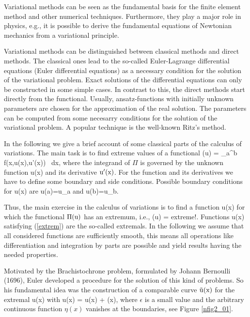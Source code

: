 \label{Foundations of the Calculus of Variations}

Variational methods can be seen as the fundamental basis for the finite
element method and other numerical techniques. Furthermore, they play
a major role in physics, e.g., it is possible to derive the fundamental 
equations of Newtonian mechanics from a variational principle.

Variational methods can be distinguished between classical methods and
direct methods. 
The classical ones lead to the so-called Euler-Lagrange 
differential equations (Euler differential equations) 
as a necessary condition for the solution of the variational problem. 
Exact solutions
of the differential equations can only be constructed in some simple 
cases. In contrast to this, the direct methods start directly from
the functional. Usually, ansatz-functions with initially unknown
parameters are chosen for the approximation of the real solution.
The parameters can be computed from some necesarry conditions for the 
solution of the variational problem. A popular technique is the
well-known Ritz's method.

In the following we give a brief account of some classical parts
of the calculus of variations. The main task is to find extreme 
values of a functional
\eb
\rm
\Pi(u) = \int_a^b f(x,u(x),u'(x)) \, dx,
\label{functionalpicalcvar}
\ee
where the integrand of $\Pi$ is governed by the unknown function
u(x) and its derivative $\rm u'(x)$. For the function and its derivatives
we have to define some boundary and side conditions. Possible boundary
conditions for u(x) are
\eb
\rm
u(a)=u_a \quad and \quad u(b)=u_b.
\ee

Thus, the main exercise in the calculus of variations is to find a function
u(x) for which the functional $\rm \Pi(u)$ has an extremum, i.e.,
\eb
\rm
\Pi(u) = extreme!.
\label{extrem}
\ee
Functions u(x) satisfying (\ref{extrem}) are the so-called extremals. In the
following we assume that all considered functions are sufficiently
smooth, this means all operations like differentiation and integration
by parts are possible and yield results having the needed properties.

Motivated by the Brachistochrone problem, formulated by Johann Bernoulli (1696),
Euler developed a procedure for the solution of this kind of problems. 
So
his fundamental idea was the construction of a comparable curve $\rm \tilde u(x)$
for the extremal  u(x) with
\eb
\rm
\tilde u(x) = u(x) + \epsilon \eta(x),
\label{vartli}
\ee
where $\epsilon$ is a small value and the arbitrary continuous function
$\eta(x)$ vanishes at the boundaries, see Figure \ref{nfig2_01}.

